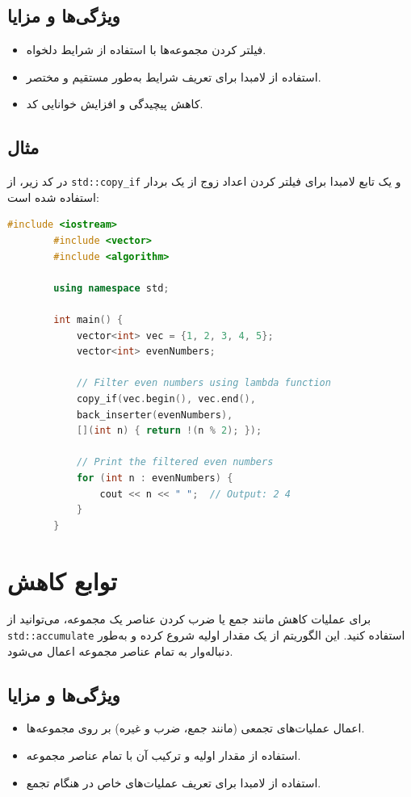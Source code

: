 \documentclass[12pt, a4paper]{report}
\begin{document}
\subsection{ویژگی‌ها و مزایا}
\begin{itemize}
	\item فیلتر کردن مجموعه‌ها با استفاده از شرایط دلخواه.
	\item استفاده از لامبدا برای تعریف شرایط به‌طور مستقیم و مختصر.
	\item کاهش پیچیدگی و افزایش خوانایی کد.
\end{itemize}

\subsection{مثال}
در کد زیر، از \texttt{std::copy\_if} و یک تابع لامبدا برای فیلتر کردن اعداد زوج از یک بردار استفاده شده است:

\begin{LTR}
	\begin{lstlisting}[language=C++, breaklines=true]
		#include <iostream>
		#include <vector>
		#include <algorithm>
		
		using namespace std;
		
		int main() {
			vector<int> vec = {1, 2, 3, 4, 5};
			vector<int> evenNumbers;
			
			// Filter even numbers using lambda function
			copy_if(vec.begin(), vec.end(), 
			back_inserter(evenNumbers),
			[](int n) { return !(n % 2); });
			
			// Print the filtered even numbers
			for (int n : evenNumbers) {
				cout << n << " ";  // Output: 2 4
			}
		}
	\end{lstlisting}
\end{LTR}

\section{توابع کاهش}

برای عملیات کاهش مانند جمع یا ضرب کردن عناصر یک مجموعه، می‌توانید از \texttt{std::accumulate} استفاده کنید. این الگوریتم از یک مقدار اولیه شروع کرده و به‌طور دنباله‌وار به تمام عناصر مجموعه اعمال می‌شود.

\subsection{ویژگی‌ها و مزایا}
\begin{itemize}
	\item اعمال عملیات‌های تجمعی (مانند جمع، ضرب و غیره) بر روی مجموعه‌ها.
	\item استفاده از مقدار اولیه و ترکیب آن با تمام عناصر مجموعه.
	\item استفاده از لامبدا برای تعریف عملیات‌های خاص در هنگام تجمع.
\end{itemize}
\end{document}
